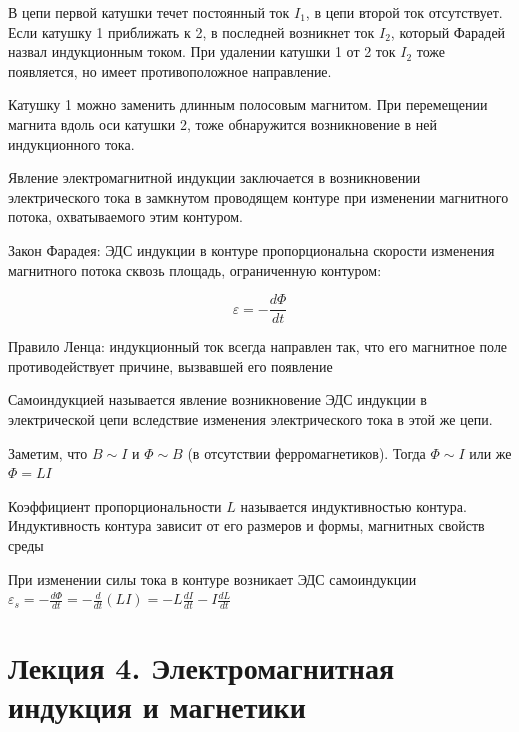 \documentclass[12pt]{article}
\begin{document}
В цепи первой катушки течет постоянный ток $I_1$, в цепи второй ток отсутствует. 
Если катушку 1 приближать к 2, в последней возникнет ток $I_2$, который Фарадей назвал индукционным током. 
При удалении катушки 1 от 2 ток $I_2$ тоже появляется, но имеет противоположное направление.

Катушку 1 можно заменить длинным полосовым магнитом. При перемещении магнита вдоль оси катушки 2, тоже обнаружится возникновение в ней 
индукционного тока.

Явление электромагнитной индукции заключается в возникновении электрического тока в замкнутом проводящем
контуре при изменении магнитного потока, охватываемого этим контуром. 

\begin{MyTheorem}
    Закон Фарадея: ЭДС индукции в контуре пропорциональна скорости изменения магнитного потока сквозь площадь, 
    ограниченную контуром:

    \[\varepsilon = - \frac{d\Phi}{dt}\]
\end{MyTheorem}

\begin{MyTheorem}
    Правило Ленца: индукционный ток всегда направлен так, что его магнитное поле противодействует причине, вызвавшей его появление
\end{MyTheorem}

Самоиндукцией называется явление возникновение ЭДС индукции в электрической цепи вследствие
изменения электрического тока в этой же цепи.

Заметим, что $B \sim I$ и $\Phi \sim B$ (в отсутствии ферромагнетиков). Тогда $\Phi \sim I$ или же $\Phi = LI$

Коэффициент пропорциональности $L$ называется индуктивностью контура. Индуктивность контура зависит от его размеров
и формы, магнитных свойств среды

При изменении силы тока в контуре возникает ЭДС самоиндукции $\varepsilon_s = -\frac{d\Phi}{dt} = -\frac{d}{dt}(LI) = -L\frac{dI}{dt} - I\frac{dL}{dt}$

\clearpage







\section{Лекция 4. Электромагнитная индукция и магнетики}
\end{document}
